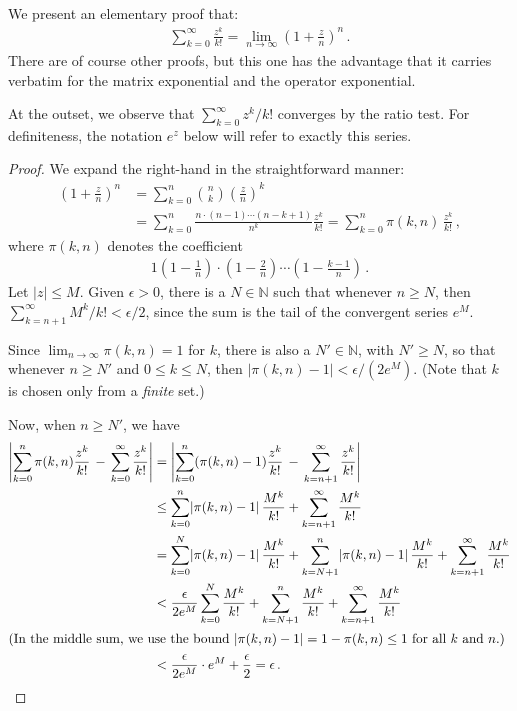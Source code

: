 \documentclass[12pt]{article}
\newcommand{\nat}{\mathbb{N}}
\providecommand{\abs}[1]{\lvert#1\rvert}
\providecommand{\absW}[1]{\left\lvert#1\right\rvert}
\begin{document}
We present an elementary proof that:
\begin{align*}
\sum_{k=0}^\infty \frac{z^k}{k!} = \lim_{n\to\infty} \left( 1 + \frac{z}{n} \right)^n\,.
\end{align*}
There are of course other proofs, but this one has the advantage that it carries verbatim for the matrix exponential and the operator exponential. 

At the outset, we observe that 
$\sum_{k=0}^\infty z^k/k!$ converges by the ratio test. 
For definiteness, the notation $e^z$ below will refer to exactly this series.

\begin{proof}
We expand the right-hand  in the straightforward manner:
\begin{align*}
\left( 1 + \frac{z}{n} \right)^n &= \sum_{k=0}^n \binom{n}{k} \left(\frac{z}{n}\right)^k \\
&= \sum_{k=0}^n \frac{n \cdot (n-1) \dotsm (n-k+1) }{n^k} \frac{z^k}{k!} 
= \sum_{k=0}^n \pi(k, n) \, \frac{z^k}{k!}\,,
\end{align*}
where $\pi(k, n)$ denotes the coefficient
\begin{align*}
1 \left(1 - \frac{1}{n}\right) \cdot \left(1 -\frac{2}{n} \right) \dotsm \left(1 - \frac{k-1}{n} \right)\,.
\end{align*}
Let $\abs{z} \leq M$.
Given $\epsilon > 0$, there is a $N \in \nat$ such that whenever $n \geq N$, then
$\sum_{k=n+1}^\infty M^k/k! < \epsilon/2$, 
since the sum is the tail of the convergent series $e^M$.

Since $\lim_{n \to \infty} \pi(k,n) = 1$ for  $k$, there is also a $N' \in \nat$, with $N' \geq N$, so that whenever $n \geq N'$ and $0 \leq k \leq N$, then
$\abs{\pi(k, n) - 1} < \epsilon/(2e^{M})$.
(Note that $k$ is chosen only from a \emph{finite} set.)

Now, when $n \geq N'$, we have
\begin{align*}
\absW{ \sum_{k=0}^n \pi(k,n) \frac{z^k}{k!} \,-\, \sum_{k=0}^\infty \frac{z^k}{k!} } 
&= \absW{
\sum_{k=0}^n (\pi(k,n)-1) \frac{z^k}{k!} \,-\, \sum_{k=n+1}^\infty \frac{z^k}{k!} } \\
&\leq 
\sum_{k=0}^n \abs{\pi(k,n) -1} \, \frac{M^k}{k!} + \sum_{k=n+1}^\infty \frac{M^k}{k!} \\
&=
\sum_{k=0}^{N} \abs{\pi(k,n) -1} \, \frac{M^k}{k!} + \sum_{k=N+1}^n
\abs{\pi(k,n) -1} \, \frac{M^k}{k!} 
+ \sum_{k=n+1}^\infty \frac{M^k}{k!} \\
&< \frac{\epsilon}{2e^M} \sum_{k=0}^{N} \frac{M^k}{k!} + \sum_{k=N + 1}^n \frac{M^k}{k!} + \sum_{k=n+1}^\infty \frac{M^k}{k!} \\
\intertext{(In the middle sum, we use the bound $\abs{\pi(k,n) -1} = 1 - \pi(k,n) \leq 1$ for all $k$ and $n$.)} &< \frac{\epsilon}{2e^M} \cdot e^M + \frac{\epsilon}{2} = \epsilon\,. \qedhere
\end{align*}
\end{proof}
\end{document}

